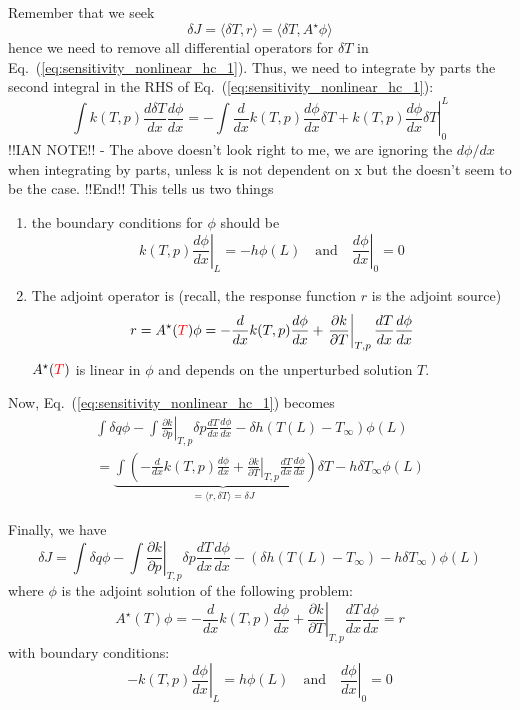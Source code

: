 \documentclass[11pt]{article}
\newcommand{\eqt}[1]{Eq.~(\ref{#1})}                     %
\newcommand{\be}{\begin{equation}}
\newcommand{\ee}{\end{equation}}
\newcommand{\tcr}[1]{\textcolor{red}{#1}}
\begin{document}
Remember that we seek 
\[
\delta J = \langle \delta T, r \rangle = \langle \delta T, A^\star \phi \rangle 
\]
hence we need to remove all differential operators for $\delta T$ in \eqt{eq:sensitivity_nonlinear_hc_1}. Thus, we need to integrate by parts the second integral in the RHS of \eqt{eq:sensitivity_nonlinear_hc_1}:
\[
\int k(T,p)\frac{d\delta T}{dx}\frac{d\phi}{dx} 
=
-\int \frac{d}{dx}k(T,p)\frac{d\phi}{dx} \delta T + \left.k(T,p)\frac{d\phi}{dx}\delta T\right|_0^L
\]
!!IAN NOTE!! - The above doesn't look right to me, we are ignoring the $d \phi /dx$ when integrating by parts, unless k is not dependent on x but the doesn't seem to be the case. !!End!!
This tells us two things
\begin{enumerate}
\item the boundary conditions for $\phi$ should be
\[
\left.k(T,p)\frac{d\phi}{dx}\right|_L = -h\phi(L) \quad \text{and} \quad \left.\frac{d\phi}{dx}\right|_0 = 0
\]
\item The adjoint operator is (recall, the response function $r$ is the adjoint source)
\[
r=A^\star(\tcr{T}) \phi  = -\frac{d}{dx}k(T,p)\frac{d\phi}{dx} + \left.\frac{\partial k}{\partial T}\right|_{T,p} \frac{dT}{dx}\frac{d\phi}{dx} 
\]
$A^\star(\tcr{T})$ is linear in $\phi$ and depends on the unperturbed solution $T$.
\end{enumerate}

Now, \eqt{eq:sensitivity_nonlinear_hc_1} becomes
\begin{multline}
\int \delta q\phi 
-\int \left.\frac{\partial k}{\partial p}\right|_{T,p}\delta p \frac{dT}{dx}\frac{d\phi}{dx} 
-\delta h(T(L)-T_\infty)  \phi(L)
\\=
\underbrace{
\int \left(
- \frac{d}{dx}k(T,p)\frac{d\phi}{dx} 
+ \left.\frac{\partial k}{\partial T}\right|_{T,p} \frac{dT}{dx}\frac{d\phi}{dx} 
\right) 
\delta T 
}
_{=\langle r,\delta T \rangle = \delta J}
-h\delta T_\infty \phi(L)
\end{multline}

Finally, we have
\be
\boxed{
\delta J = 
\int \delta q\phi 
-\int \left.\frac{\partial k}{\partial p}\right|_{T,p}\delta p \frac{dT}{dx}\frac{d\phi}{dx} 
-\left(\delta h(T(L)-T_\infty)  - h\delta T_\infty \right)\phi(L)
}
\ee
where $\phi$ is the adjoint solution of the following problem:
\[
A^\star(T) \phi  = -\frac{d}{dx}k(T,p)\frac{d\phi}{dx} + \left.\frac{\partial k}{\partial T}\right|_{T,p} \frac{dT}{dx}\frac{d\phi}{dx} = r
\]
with boundary conditions:
\[
-\left.k(T,p)\frac{d\phi}{dx}\right|_L = h\phi(L) \quad \text{and} \quad \left.\frac{d\phi}{dx}\right|_0 = 0
\]
\end{document}
